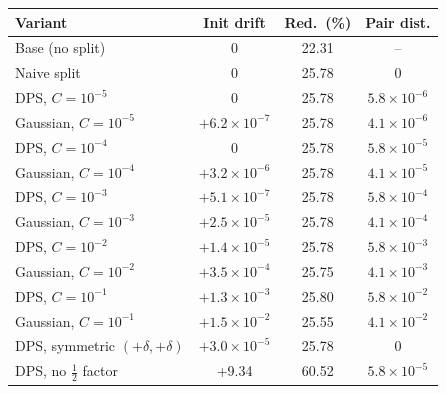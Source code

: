 \begin{tabular}{@{}lccc@{}}
\toprule
\textbf{Variant} & \textbf{Init drift} & \textbf{Red.\ (\%)} & \textbf{Pair dist.} \\
\midrule
Base (no split) & 0 & 22.31 & -- \\
Naive split & 0 & 25.78 & 0 \\
\midrule
DPS, $C{=}10^{-5}$ & 0 & 25.78 & $5.8{\times}10^{-6}$ \\
Gaussian, $C{=}10^{-5}$ & $+6.2{\times}10^{-7}$ & 25.78 & $4.1{\times}10^{-6}$ \\
DPS, $C{=}10^{-4}$ & 0 & 25.78 & $5.8{\times}10^{-5}$ \\
Gaussian, $C{=}10^{-4}$ & $+3.2{\times}10^{-6}$ & 25.78 & $4.1{\times}10^{-5}$ \\
DPS, $C{=}10^{-3}$ & $+5.1{\times}10^{-7}$ & 25.78 & $5.8{\times}10^{-4}$ \\
Gaussian, $C{=}10^{-3}$ & $+2.5{\times}10^{-5}$ & 25.78 & $4.1{\times}10^{-4}$ \\
DPS, $C{=}10^{-2}$ & $+1.4{\times}10^{-5}$ & 25.78 & $5.8{\times}10^{-3}$ \\
Gaussian, $C{=}10^{-2}$ & $+3.5{\times}10^{-4}$ & 25.75 & $4.1{\times}10^{-3}$ \\
DPS, $C{=}10^{-1}$ & $+1.3{\times}10^{-3}$ & 25.80 & $5.8{\times}10^{-2}$ \\
Gaussian, $C{=}10^{-1}$ & $+1.5{\times}10^{-2}$ & 25.55 & $4.1{\times}10^{-2}$ \\
\midrule
DPS, symmetric $(+\delta,+\delta)$ & $+3.0{\times}10^{-5}$ & 25.78 & 0 \\
DPS, no $\tfrac{1}{2}$ factor & +9.34 & 60.52 & $5.8{\times}10^{-5}$ \\
\bottomrule
\end{tabular}
